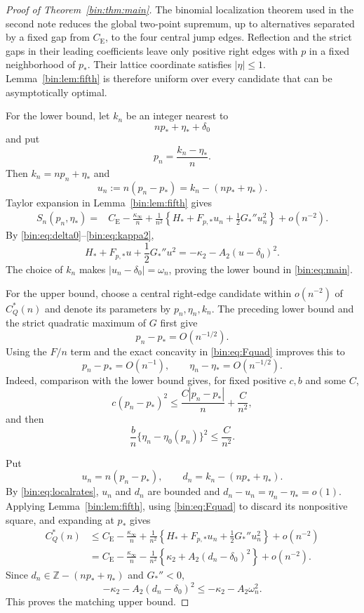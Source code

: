 \documentclass[11pt,a4paper]{article}
\numberwithin{equation}{section}
\theoremstyle{definition}
\theoremstyle{remark}
\newcommand{\CE}{C_{\mathrm E}}
\begin{document}
\begin{proof}[Proof of Theorem~\ref{bin:thm:main}]
The binomial localization theorem used in the second note reduces the
global two-point supremum, up to alternatives separated by a fixed gap
from $\CE$, to the four central jump edges.  Reflection and the strict
gaps in their leading coefficients leave only positive right edges with
$p$ in a fixed neighborhood of $p_*$.  Their lattice coordinate satisfies
$|\eta|\le1$.  Lemma~\ref{bin:lem:fifth} is therefore uniform over every
candidate that can be asymptotically optimal.

For the lower bound, let $k_n$ be an integer nearest to
\[
 np_*+\eta_*+\delta_0
\]
and put
\[
 p_n=\frac{k_n-\eta_*}{n}.
\]
Then $k_n=np_n+\eta_*$ and
\[
 u_n:=n(p_n-p_*)=k_n-(np_*+\eta_*).
\]
Taylor expansion in Lemma~\ref{bin:lem:fifth} gives
\begin{align}
 S_n(p_n,\eta_*)
 ={}&\CE-\frac{\kappa_\infty}{n}
 +\frac1{n^2}
 \left\{H_*+F_{p,*}u_n+\frac12G_*''u_n^2\right\}
 +o(n^{-2}).
 \label{bin:eq:lowerquad}
\end{align}
By \eqref{bin:eq:delta0}--\eqref{bin:eq:kappa2},
\begin{equation}\label{bin:eq:completesquare}
 H_*+F_{p,*}u+\frac12G_*''u^2
 =-\kappa_2-A_2(u-\delta_0)^2.
\end{equation}
The choice of $k_n$ makes $|u_n-\delta_0|=\omega_n$, proving the lower
bound in \eqref{bin:eq:main}.

For the upper bound, choose a central right-edge candidate within
$o(n^{-2})$ of $C_Q^*(n)$ and denote its parameters by $p_n,\eta_n,k_n$.
The preceding lower bound and the strict quadratic maximum of $G$ first
give
\[
 p_n-p_*=O(n^{-1/2}).
\]
Using the $F/n$ term and the exact concavity in \eqref{bin:eq:Fquad} improves
this to
\begin{equation}\label{bin:eq:localrates}
 p_n-p_*=O(n^{-1}),
 \qquad
 \eta_n-\eta_*=O(n^{-1/2}).
\end{equation}
Indeed, comparison with the lower bound gives, for fixed positive
$c,b$ and some $C$,
\[
 c(p_n-p_*)^2
 \le \frac{C|p_n-p_*|}{n}+\frac{C}{n^2},
\]
and then
\[
 \frac{b}{n}\{\eta_n-\eta_0(p_n)\}^2\le\frac{C}{n^2}.
\]

Put
\[
 u_n=n(p_n-p_*),
 \qquad
 d_n=k_n-(np_*+\eta_*).
\]
By \eqref{bin:eq:localrates}, $u_n$ and $d_n$ are bounded and
$d_n-u_n=\eta_n-\eta_*=o(1)$.  Applying Lemma~\ref{bin:lem:fifth}, using
\eqref{bin:eq:Fquad} to discard its nonpositive square, and expanding at
$p_*$ gives
\begin{align*}
 C_Q^*(n)
 &\le \CE-\frac{\kappa_\infty}{n}
 +\frac1{n^2}
 \left\{H_*+F_{p,*}u_n+\frac12G_*''u_n^2\right\}
 +o(n^{-2})\\
 &=\CE-\frac{\kappa_\infty}{n}
 -\frac1{n^2}\left\{\kappa_2+A_2(d_n-\delta_0)^2\right\}
 +o(n^{-2}).
\end{align*}
Since $d_n\in\mathbb Z-(np_*+\eta_*)$ and $G_*''<0$,
\[
 -\kappa_2-A_2(d_n-\delta_0)^2
 \le -\kappa_2-A_2\omega_n^2.
\]
This proves the matching upper bound.
\end{proof}
\end{document}
